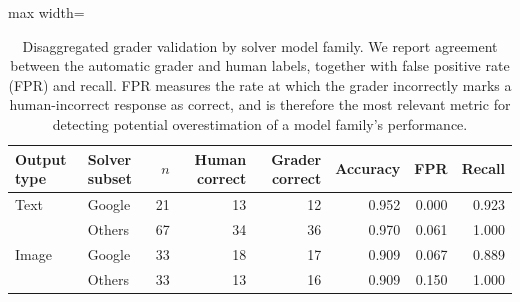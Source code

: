 \begin{table}[t]
\centering
\caption{
Disaggregated grader validation by solver model family. We report agreement between the automatic grader and human labels, together with false positive rate (FPR) and recall. FPR measures the rate at which the grader incorrectly marks a human-incorrect response as correct, and is therefore the most relevant metric for detecting potential overestimation of a model family's performance.
}
\label{tab:pipeline_validation_bias}
\begin{adjustbox}{max width=\textwidth}
\begin{tabular}{llrrrrrr}
\toprule
Output type & Solver subset & $n$ & Human correct & Grader correct & \textbf{Accuracy} & \textbf{FPR} & \textbf{Recall} \\
\midrule
Text & Google & 21 & 13 & 12 & 0.952 & 0.000 & 0.923 \\
 & Others & 67 & 34 & 36 & 0.970 & 0.061 & 1.000 \\
\midrule
Image & Google & 33 & 18 & 17 & 0.909 & 0.067 & 0.889 \\
 & Others & 33 & 13 & 16 & 0.909 & 0.150 & 1.000 \\
\bottomrule
\end{tabular}
\end{adjustbox}
\end{table}
